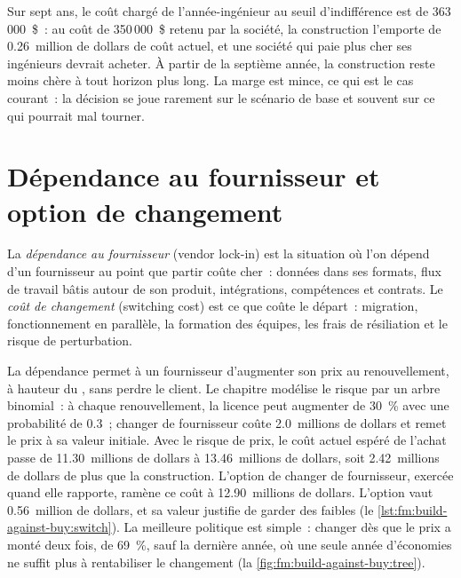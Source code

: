 Sur sept ans, le coût chargé de l'année-ingénieur au seuil d'indifférence est de 363\,000~\$~: au coût de 350\,000~\$ retenu par la société, la construction l'emporte de 0.26~million de dollars de coût actuel,
et une société qui paie plus cher ses ingénieurs devrait acheter. À partir de la septième année, la construction reste moins chère à tout horizon plus long. La marge est mince,
ce qui est le cas courant~: la décision se joue rarement sur le scénario de base et souvent sur ce qui pourrait mal tourner.

\section{Dépendance au fournisseur et option de changement}

\begin{definition}\label{def:fm:build-against-buy:lockin}
La \emph{dépendance au fournisseur} (vendor lock-in) est la situation où l'on dépend d'un fournisseur au point que partir coûte cher~: données dans ses formats, flux de travail bâtis autour
de son produit, intégrations, compétences et contrats. Le \emph{coût de changement} (switching cost) est ce que coûte le départ~: migration, fonctionnement en parallèle,
la formation des équipes, les frais de résiliation et le risque de perturbation.
\end{definition}

La dépendance permet à un fournisseur d'augmenter son prix au renouvellement, à hauteur du , sans perdre le client. Le chapitre modélise le risque par un arbre binomial~:
à chaque renouvellement, la licence peut augmenter de 30~\% avec une probabilité de 0.3~; changer de fournisseur coûte 2.0~millions de dollars et remet le prix à sa valeur initiale. Avec
le risque de prix, le coût actuel espéré de l'achat passe de 11.30~millions de dollars à 13.46~millions de dollars, soit 2.42~millions de dollars de plus que la construction. L'option de
changer de fournisseur, exercée quand elle rapporte, ramène ce coût à 12.90~millions de dollars. L'option vaut 0.56~million de dollars, et sa valeur justifie de garder
des  faibles (le \cref{lst:fm:build-against-buy:switch}). La meilleure politique est simple~: changer dès que le prix a monté deux fois, de 69~\%,
sauf la dernière année, où une seule année d'économies ne suffit plus à rentabiliser le changement (la \cref{fig:fm:build-against-buy:tree}).

